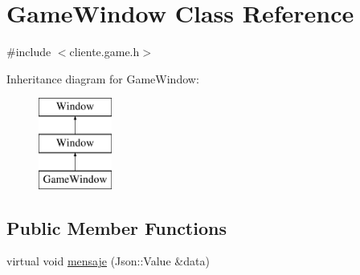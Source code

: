 \hypertarget{classGameWindow}{\section{Game\-Window Class Reference}
\label{classGameWindow}
}


{\ttfamily \#include $<$cliente.\-game.\-h$>$}

Inheritance diagram for Game\-Window\-:\begin{figure}[H]
\begin{center}
\leavevmode
\includegraphics[height=3.000000cm]{classGameWindow}
\end{center}
\end{figure}
\subsection*{Public Member Functions}
\begin{DoxyCompactItemize}
\item 
virtual void \hyperlink{classGameWindow_a3c37318c59913c4232757afebec0e7e1}{mensaje} (Json\-::\-Value \&data)
\end{DoxyCompactItemize}
